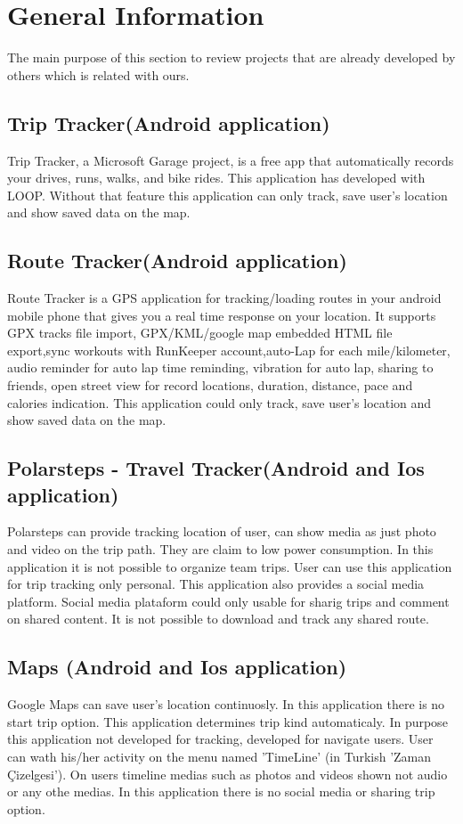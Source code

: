 \chapter{General Information}
The main purpose of this section to review projects that are already developed by others which is related with ours.
\section{Trip Tracker(Android application)}
Trip Tracker\cite{triptracker}, a Microsoft Garage project, is a free app that automatically records your drives, runs, walks, and bike rides. This application has developed with LOOP\cite{loop}. Without that feature this application can only track, save user's location and show saved data on the map.

\section{Route Tracker(Android application)}
Route Tracker\cite{routetracker} is a GPS application for tracking/loading routes in your android mobile phone that gives you a real time response on your location. It supports GPX tracks file import, GPX/KML/google map embedded HTML file export,sync workouts with RunKeeper account,auto-Lap for each mile/kilometer, audio reminder for auto lap time reminding, vibration for auto lap, sharing to friends, open street view for record locations, duration, distance, pace and calories indication. This application could only track, save user's location and show saved data on the map.

\section{Polarsteps - Travel Tracker(Android and Ios application)}
Polarsteps\cite{polarsteps} can provide tracking location of user, can show media as just photo and video on the trip path. They are claim to low power consumption. In this application it is not possible to organize team trips. User can use this application for trip tracking only personal. This application also provides a social media platform. Social media plataform could only usable for sharig trips and comment on shared content. It is not possible to download and track any shared route.

\section{Maps (Android and Ios application)}
Google Maps\cite{googlemap} can save user's location continuosly. In this application there is no start trip option. This application determines trip kind automaticaly. In purpose this application not developed for tracking, developed for navigate users. User can wath his/her activity on the menu named 'TimeLine' (in Turkish 'Zaman Çizelgesi'). On users timeline medias such as photos and videos shown not audio or any othe medias. In this application there is no social media or sharing trip option.
